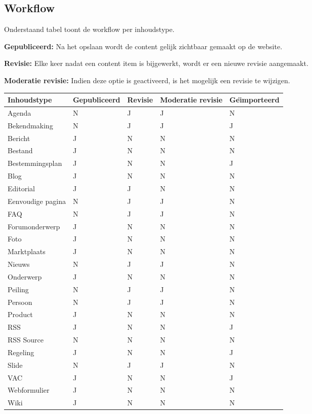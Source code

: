 \clearpage
\subsection{Workflow}\label{workflow}

Onderstaand tabel toont de workflow per inhoudstype. 

\textbf{Gepubliceerd:} Na het opslaan wordt de content gelijk zichtbaar gemaakt op de website.

\textbf{Revisie:} Elke keer nadat een content item is bijgewerkt, wordt er een nieuwe revisie aangemaakt.

\textbf{Moderatie revisie:} Indien deze optie is geactiveerd, is het mogelijk een revisie te wijzigen.

\begin{tabularx}{\textwidth}{ | p{5cm} |X|X|X|X| }
  \hline
  Inhoudstype & Gepubliceerd & Revisie & Moderatie revisie & Ge{\"\i}mporteerd \\ \hline
  Agenda & N & J  & J & N  \\ \hline
  Bekendmaking & N & J  & J & J  \\ \hline
  Bericht  & J & N  & N & N  \\ \hline
  Bestand  & J & N  & N & N  \\ \hline
  Bestemmingsplan  & J & N  & N & J  \\ \hline
  Blog  & J & N  & N & N  \\ \hline
  Editorial  & J & J  & N & N  \\ \hline
  Eenvoudige pagina  & N & J  & J & N  \\ \hline
  FAQ  & N & J  & J & N  \\ \hline
  Forumonderwerp  & J & N  & N & N  \\ \hline
  Foto  & J & N  & N & N  \\ \hline
  Marktplaats  & J & N  & N & N  \\ \hline
  Nieuws  & N & J  & J & N  \\ \hline
  Onderwerp  & J & N  & N & N  \\ \hline
  Peiling  & N & J  & J & N  \\ \hline
  Persoon  & N & J  & J & N  \\ \hline
  Product  & J & N  & N & N  \\ \hline
  RSS  & J & N  & N & J  \\ \hline
  RSS Source  & N & N  & N & N  \\ \hline
  Regeling  & J & N  & N & J  \\ \hline
  Slide  & N & J  & J & N  \\ \hline
  VAC  & J & N  & N & J  \\ \hline
  Webformulier  & J & N  & N & N  \\ \hline
  Wiki  & J & N  & N & N  \\ \hline
\end{tabularx}


